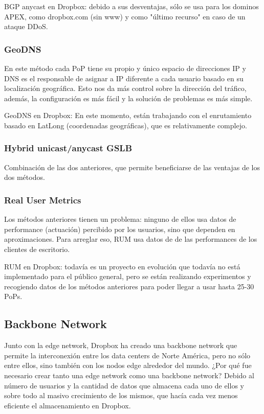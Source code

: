 BGP anycast en Dropbox: debido a sus desventajas, sólo se usa para los dominos APEX, como dropbox.com (sin www) y como "último recurso" en caso de un ataque DDoS.

\subsubsection{GeoDNS}
En este método cada PoP tiene su propio y único espacio de direcciones IP y DNS es el responsable de asignar a IP diferente a cada usuario basado en su localización geográfica. Esto nos da más control sobre la dirección del tráfico, además, la configuración es más fácil y la solución de problemas es más simple.

GeoDNS en Dropbox: En este momento, están trabajando con el enrutamiento basado en LatLong (coordenadas geográficas), que es relativamente complejo.

\subsubsection{Hybrid unicast/anycast GSLB}

Combinación de las dos anteriores, que permite beneficiarse de las ventajas de los dos métodos.

\subsubsection{Real User Metrics}
Los métodos anteriores tienen un problema: ninguno de ellos usa datos de performance (actuación) percibido por los usuarios, sino que dependen en aproximaciones. Para arreglar eso, RUM usa datos de de las performances de los clientes de escritorio.

RUM en Dropbox: todavía es un proyecto en evolución que todavía no está implementado para el público general, pero se están realizando experimentos y recogiendo datos de los métodos anteriores para poder llegar a usar hasta 25-30 PoPs.

\subsection{Backbone Network}

Junto con la edge network, Dropbox ha creado una backbone network que permite la interconexión entre los data centers de Norte América, pero no sólo entre ellos, sino también con los nodos edge alrededor del mundo. ¿Por qué fue necesario crear tanto una edge network como una backbone network? Debido al número de usuarios  y la cantidad de datos que almacena cada uno de ellos y sobre todo al masivo crecimiento de los mismos, que hacía cada vez menos eficiente el almacenamiento en Dropbox. 

